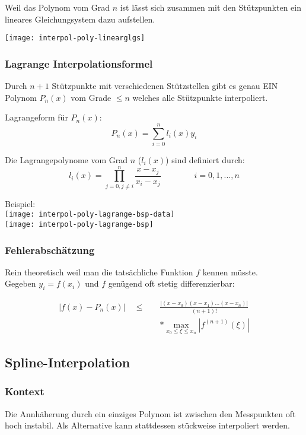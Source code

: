 Weil das Polynom vom Grad $n$ ist lässt sich zusammen mit den Stützpunkten
ein lineares Gleichungsystem dazu aufstellen.

\texttt{[image: interpol-poly-linearglgs]}


\subsubsection{Lagrange Interpolationsformel}

Durch $n+1$ Stützpunkte mit verschiedenen Stützstellen gibt es genau EIN Polynom
$P_n(x)$ vom Grade $\le n$ welches alle Stützpunkte interpoliert.

Lagrangeform für $P_n(x)$:
$$P_n(x) = \sum_{i=0}^n l_i(x) y_i$$

Die Lagrangepolynome vom Grad $n$ ($l_i(x)$) sind definiert durch:
$$l_i(x) = \prod_{j=0, j \ne i}^n \frac{x - x_j}{x_i - x_j} \qquad \qquad i = 0,1,...,n$$

Beispiel:\\
\texttt{[image: interpol-poly-lagrange-bsp-data]} \\
\texttt{[image: interpol-poly-lagrange-bsp]}


\subsubsection{Fehlerabschätzung}

Rein theoretisch weil man die tatsächliche Funktion $f$ kennen müsste.\\
Gegeben $y_i = f(x_i)$ und $f$ genügend oft stetig differenzierbar:

{
\Large
\begin{align*}
 |f(x) - P_n(x)| \quad \le \quad & \frac{|(x-x_0)(x-x_1)...(x-x_n)|}{(n+1)!}\\
                         & * \max_{x_0 \le \xi \le x_n} |f^{(n+1)}(\xi)|
\end{align*}
}



\subsection{Spline-Interpolation}

\subsubsection{Kontext}

Die Annhäherung durch ein einziges Polynom ist zwischen den Messpunkten oft
hoch instabil. Als Alternative kann stattdessen stückweise interpoliert werden.

